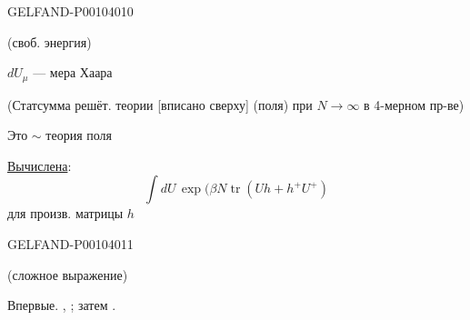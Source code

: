 \begin{GelfandAdjacentEvidence}{GELFAND-P001040}{10}

(своб. энергия)

$dU_\mu$ --- мера Хаара

(Статсумма решёт. теории [вписано сверху] (поля) при $N\to\infty$ в 4-мерном пр-ве)

Это $\sim$ теория поля

\underline{Вычислена}:
\begin{equation*}
\int dU\,\exp\bigl(\beta N\operatorname{tr}(Uh+h^+U^+)
\tag{20}
\end{equation*}
для произв. матрицы $h$
\end{GelfandAdjacentEvidence}
\begin{GelfandAdjacentEvidence}{GELFAND-P001040}{11}


(сложное выражение)

Впервые. , ; затем .
\end{GelfandAdjacentEvidence}



